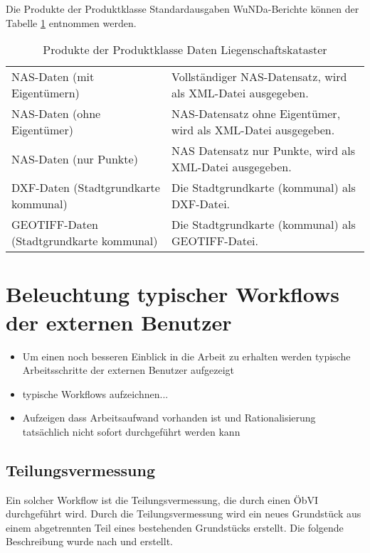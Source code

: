Die Produkte der Produktklasse Standardausgaben WuNDa-Berichte können der Tabelle \ref{tab-daten-kataster} entnommen werden.
\begin{longtable}{|p{}|p{}|}
	\caption{Produkte der Produktklasse Daten Liegenschaftskataster} \label{tab-daten-kataster} \\
	\hline 
	\head{Produktname}  & \head{Beschreibung} \tabularnewline
	\hline 
	\endhead	
				
	\acs{NAS}-Daten (mit Eigentümern)
	&
	Vollständiger \acs{NAS}-Datensatz, wird als \acs{XML}-Datei ausgegeben. \\
	\hline
	\acs{NAS}-Daten (ohne Eigentümer)
	&
	\acs{NAS}-Datensatz ohne Eigentümer, wird als \acs{XML}-Datei ausgegeben. \\
	\hline
	\acs{NAS}-Daten (nur Punkte)
	&
	\acs{NAS} Datensatz nur Punkte, wird als \acs{XML}-Datei ausgegeben. \\
	\hline
	\acs{DXF}-Daten (Stadtgrundkarte kommunal)
	&
	Die Stadtgrundkarte (kommunal) als \acs{DXF}-Datei.  \\
	\hline
	GEOTIFF-Daten (Stadtgrundkarte kommunal)
	&
	Die Stadtgrundkarte (kommunal) als GEOTIFF-Datei. \\
	\hline	
\end{longtable} 

\section{Beleuchtung typischer Workflows der externen Benutzer}
\begin{itemize}
	\item Um einen noch besseren Einblick in die Arbeit zu erhalten werden typische Arbeitsschritte der externen Benutzer aufgezeigt
	\item typische Workflows aufzeichnen...
	\item Aufzeigen dass Arbeitsaufwand vorhanden ist und Rationalisierung tatsächlich nicht sofort durchgeführt werden kann
\end{itemize}

\subsection{Teilungsvermessung}
Ein solcher Workflow ist die Teilungsvermessung, die durch einen \ac{ÖbVI} durchgeführt wird. Durch die Teilungsvermessung wird ein neues Grundstück aus einem abgetrennten Teil eines bestehenden Grundstücks erstellt. Die folgende Beschreibung wurde nach \autocite{klein-vermessung} und \autocite{jungemann-alltag} erstellt.


